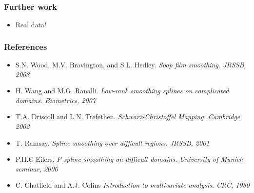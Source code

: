 \documentclass[ignorenonframetext]{beamer} %
\newcommand{\bi}{\begin{itemize}}
\newcommand{\ei}{\end{itemize}}
\begin{document}
\begin{frame}
	\frametitle{Further work}
       \bi
         \item Real data!
          
        \ei
\end{frame}




\begin{frame}
	\frametitle{References}
       \bi
         \item S.N. Wood, M.V. Bravington, and S.L. Hedley. \emph{Soap film smoothing. JRSSB, 2008}
         \item H. Wang and M.G. Ranalli. \emph{Low-rank smoothing splines on complicated domains. Biometrics, 2007}
         \item T.A. Driscoll and L.N. Trefethen. \emph{Schwarz-Christoffel Mapping. Cambridge, 2002}
         \item T. Ramsay. \emph{Spline smoothing over difficult regions. JRSSB, 2001}
         \item P.H.C Eilers, \emph{P-spline smoothing on difficult domains. University of Munich seminar, 2006}
	\item C. Chatfield and A.J. Colins \emph{Introduction to multivariate analysis. CRC, 1980}
        \ei
\end{frame}
\end{document}
